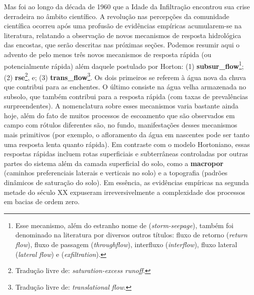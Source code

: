 \documentclass[./main.tex]{subfiles}
\begin{document}
\par Mas foi ao longo da década de 1960 que a Idade da Infiltração encontrou sua crise derradeira no âmbito científico. A revolução nas percepções da comunidade científica ocorreu após uma profusão de evidências empíricas acumularem-se na literatura, relatando a observação de novos mecanismos de resposta hidrológica das encostas, que serão descritas nas próximas seções. Podemos resumir aqui o advento de pelo menos três novos mecanismos de resposta rápida (ou potencialmente rápida) além daquele postulado por Horton: (1) \textbf{\gls{subsur_flow}}\footnote{Esse mecanismo, além do estranho nome de  (\textit{storm-seepage}), também foi denominado na literatura por diversos outros títulos: fluxo de retorno (\textit{return flow}), fluxo de passagem (\textit{throughflow}), interfluxo (\textit{interflow}), fluxo lateral (\textit{lateral flow}) e  (\textit{exfiltration}).}; (2) \textbf{\gls{rse}}\footnote{Tradução livre de: \textit{saturation-excess runoff}.}, e; (3) \textbf{\gls{trans_flow}}\footnote{Tradução livre de: \textit{translational flow}.}. Os dois primeiros se referem à água nova da chuva que contribui para as enchentes. O último consiste na água velha armazenada no subsolo, que também contribui para a resposta rápida (com taxas de prevalências surpreendentes). A nomenclatura sobre esses mecanismos varia bastante ainda hoje, além do fato de muitos processos de escoamento que são observados em campo com rótulos diferentes são, no fundo, manifestações desses mecanismos mais primitivos (por exemplo, o afloramento da água em nascentes pode ser tanto uma resposta lenta quanto rápida). Em contraste com o modelo Hortoniano, essas respostas rápidas incluem rotas superficiais e subterrâneas controladas por outras partes do sistema além da camada superficial do solo, como a \textbf{\gls{macropor}} (caminhos preferenciais laterais e verticais no solo) e a topografia (padrões dinâmicos de saturação do solo). Em essência, as evidências empíricas na segunda metade do século XX expuseram irreversivelmente a complexidade dos processos em bacias de ordem zero.
\end{document}
